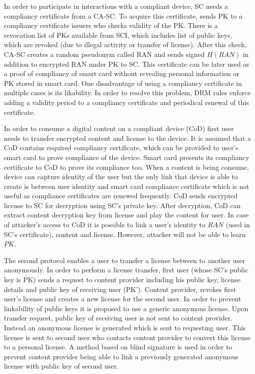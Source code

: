 \documentclass[times]{secauth}
\begin{document}
In order to participate in interactions with a compliant device, SC needs a compliancy certificate from a CA-SC. To acquire this certificate, sends PK to a compliancy certificate issuers who checks validity of the PK. There is a revocation list of PKs available from SCI, which includes list of public keys, which are revoked (due to illegal activity or transfer of license). After this check, CA-SC creates a random pseudonym called RAN and sends signed $H(RAN)$ in addition to encrypted RAN under PK to SC. This certificate can be later used as a proof of compliancy of smart card without revealing personal information or PK stored in smart card. One disadvantage of using a compliancy certificate in multiple cases is its likability. In order to resolve this problem, DRM rules enforce adding a validity period to a compliancy certificate and periodical renewal of this certificate.

In order to consume a digital content on a compliant device (CoD) first user needs to transfer encrypted content and license to the device. It is assumed that a CoD contains required compliancy certificate, which can be provided to user's smart card to prove compliance of the device. Smart card presents its compliancy certificate to CoD to prove its compliance too. When a content is being consume, device can capture identity of the user but the only link that device is able to create is between user identity and smart card compliance certificate which is not useful as compliance certificates are renewed frequently.
CoD sends encrypted license to SC for decryption using SC's private key. After decryption, CoD can extract content decryption key from license and play the content for user. 
In case of attacker's access to CoD it is possible to link a user's identity to $RAN$ (used in SC's certificate), content and license. However, attacker will not be able to learn $PK$. 

The second protocol enables a user to transfer a license between to another user anonymously. In order to perform a license transfer, first user (whose SC's public key is PK) sends a request to content provider including his public key, license details and public key of receiving user (PK'). Content provider, revokes first user's license and creates a new license for the second user. In order to prevent linkability of public keys it is proposed to use a generic anonymous license. Upon transfer request, public key of receiving user is not sent to content provider. Instead an anonymous license is generated which is sent to requesting user. This license is sent to second user who contacts content provider to convert this license to a personal license. A method based on blind signature is used in order to prevent content provider being able to link a previously generated anonymous license with public key of second user.
\end{document}
